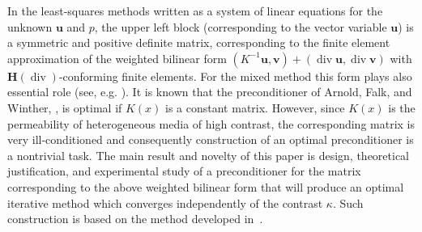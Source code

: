 \documentclass[11pt]{amsart}
\numberwithin{equation}{section}
\theoremstyle{definition}\newtheorem{example}{Example}[section]
\begin{document}
In the least-squares methods written as a system of linear equations
for the unknown ${{\mathbf u}}$ and $p$, the upper left block (corresponding to
the vector variable ${{\mathbf u}}$) is a symmetric and positive definite matrix,
corresponding to the finite element approximation of the weighted
bilinear form $(K^{-1}{{\mathbf u}}, {{\mathbf v}}) + ({\operatorname{div}} {{\mathbf u}}, {\operatorname{div}} {{\mathbf v}})$ with
${{\boldsymbol H}}({\operatorname{div}})$-conforming finite elements.  For the mixed method this form
plays also essential role (see,
e.g. \cite{Arnold1997preconditioning}).  It is known that the
preconditioner of Arnold, Falk, and Winther,
\cite{Arnold1997preconditioning, Arnold2000MG}, is optimal if $K(x)$
is a constant matrix. However, since $K(x)$ is the permeability of
heterogeneous media of high contrast, the corresponding matrix is very
ill-conditioned and consequently construction of an optimal
preconditioner is a nontrivial task.
The main result and novelty of this paper is design, theoretical justification, and 
experimental  study of a preconditioner for the matrix corresponding 
to the above weighted bilinear form 
that will produce an optimal iterative method  which converges independently
of the contrast $\kappa$.  Such construction is based on the
method developed in~\cite{Kraus_Lymb_Mar_2014}.
\end{document}
